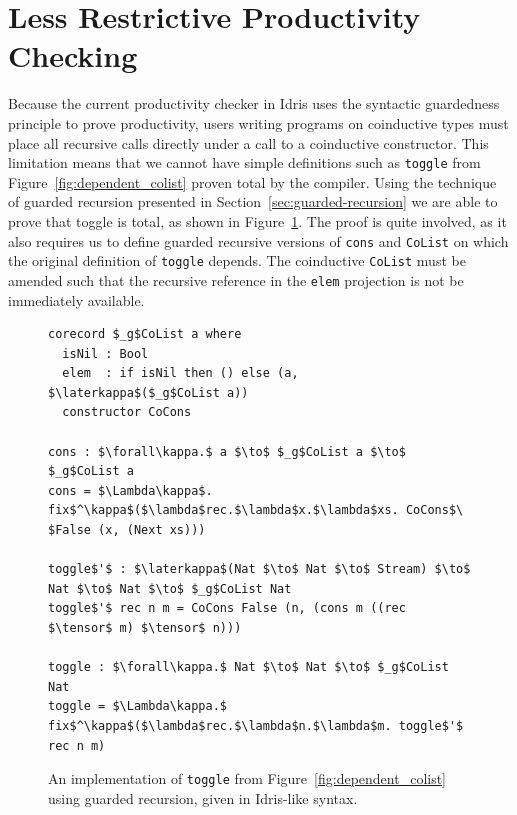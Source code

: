 \section{Less Restrictive Productivity Checking} 
\label{sec:less-restr-prod}


Because the current productivity checker in Idris uses the syntactic
guardedness principle to prove productivity, users writing programs on
coinductive types must place all recursive calls directly under a call to a
coinductive constructor. This limitation means that we cannot have simple
definitions such as \texttt{toggle} from Figure~\ref{fig:dependent_colist}
proven total by the compiler. Using the technique of guarded recursion presented
in Section~\ref{sec:guarded-recursion} we are able to prove that toggle is
total, as shown in Figure~\ref{fig:toggle_guarded_recursion}. The proof is quite
involved, as it also requires us to define guarded recursive versions of
\texttt{cons} and \texttt{CoList} on which the original definition of
\texttt{toggle} depends. The coinductive \texttt{CoList} must be amended such
that the recursive reference in the \texttt{elem} projection is not be
immediately available.

\begin{figure}[h]
\begin{lstlisting}[mathescape]
corecord $_g$CoList a where
  isNil : Bool
  elem  : if isNil then () else (a, $\laterkappa$($_g$CoList a))
  constructor CoCons

cons : $\forall\kappa.$ a $\to$ $_g$CoList a $\to$ $_g$CoList a
cons = $\Lambda\kappa$. fix$^\kappa$($\lambda$rec.$\lambda$x.$\lambda$xs. CoCons$\ $False (x, (Next xs)))

toggle$'$ : $\laterkappa$(Nat $\to$ Nat $\to$ Stream) $\to$ Nat $\to$ Nat $\to$ $_g$CoList Nat
toggle$'$ rec n m = CoCons False (n, (cons m ((rec $\tensor$ m) $\tensor$ n))) 

toggle : $\forall\kappa.$ Nat $\to$ Nat $\to$ $_g$CoList Nat
toggle = $\Lambda\kappa.$ fix$^\kappa$($\lambda$rec.$\lambda$n.$\lambda$m. toggle$'$ rec n m)
\end{lstlisting}
  \caption{An implementation of \texttt{toggle} from
    Figure~\ref{fig:dependent_colist} using guarded recursion, given in
    Idris-like syntax.}
\label{fig:toggle_guarded_recursion}
\end{figure}

